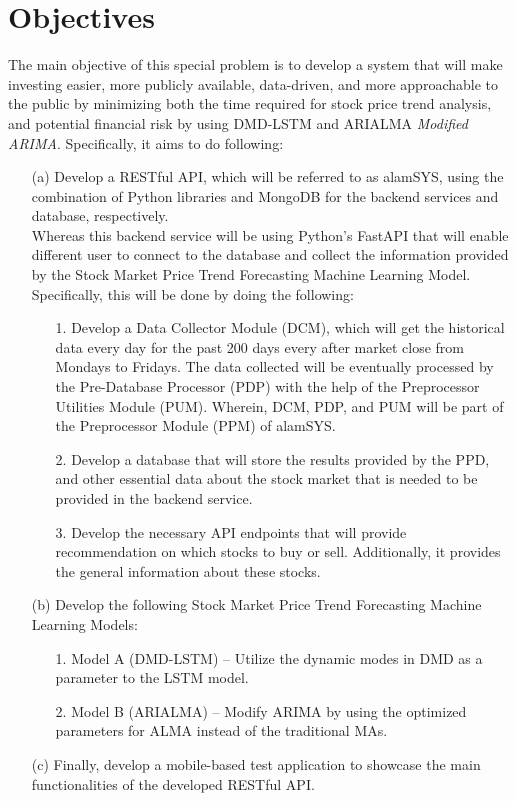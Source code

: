 \section{Objectives}
\label{sec:objectives}
The main objective of this special problem is to develop a 
system that will make investing easier, more publicly available, 
data-driven, and more approachable to the public by minimizing both the 
time required for stock price trend analysis, and potential financial risk 
by using DMD-LSTM and ARIALMA \textit{Modified ARIMA}. Specifically, it aims to do following:
\begin{itemize}
  \item[(a)] Develop a RESTful API, which will be referred to as alamSYS, 
  using the combination of Python libraries and MongoDB for the backend 
  services and database, respectively.
  \hfill \\
  
  Whereas this backend service will be using Python’s 
  FastAPI that will enable different user to connect to 
  the database and collect the information provided by the 
  Stock Market Price Trend Forecasting Machine Learning Model.
  \hfill \\
  
  Specifically, this will be done by doing the following:
  \begin{itemize}
    \item[1.]	Develop a Data Collector Module (DCM), 
    which will get the historical data every day for 
    the past 200 days every after market close from Mondays to Fridays. 
    The data collected will be eventually processed by the Pre-Database Processor 
    (PDP) with the help of the Preprocessor Utilities Module (PUM). 
    Wherein, DCM, PDP, and PUM will be part of the Preprocessor Module 
    (PPM) of alamSYS.
    \item[2.]	Develop a database that will store the results provided by the PPD,
    and other essential data about the stock market that is needed to be provided
    in the backend service.
    \item[3.]	Develop the necessary API endpoints 
    that will provide recommendation on which stocks to buy or sell. 
    Additionally, it provides the general information about these stocks.
  \end{itemize}
  \item[(b)] Develop the following Stock Market Price Trend Forecasting 
  Machine Learning Models:
  \begin{itemize}
    \item[1.]	Model A (DMD-LSTM) – Utilize the dynamic modes in DMD as a 
    parameter to the LSTM model.
    \item[2.] Model B (ARIALMA) – Modify ARIMA by using 
    the optimized parameters for ALMA instead of the traditional MAs.
  \end{itemize}
  \item[(c)] Finally, develop a mobile-based test application to showcase 
  the main functionalities of the developed RESTful API.
\end{itemize}